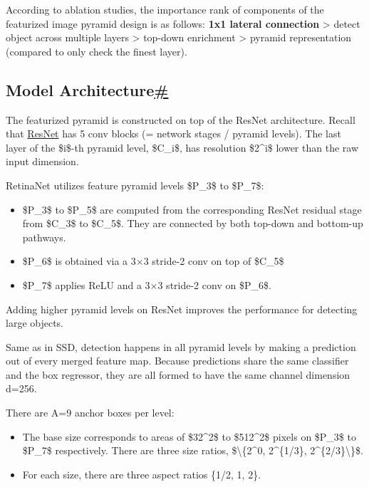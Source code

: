According to ablation studies, the importance rank of components of the featurized image pyramid design is as follows: \textbf{1x1 lateral connection} \textgreater{} detect object across multiple layers \textgreater{} top-down enrichment \textgreater{} pyramid representation (compared to only check the finest layer).

\subsection{\texorpdfstring{Model Architecture\hyperref[model-architecture]{\#}}{Model Architecture\#}}\label{model-architecture}

The featurized pyramid is constructed on top of the ResNet architecture. Recall that \href{TBA}{ResNet} has 5 conv blocks (= network stages / pyramid levels). The last layer of the \$i\$-th pyramid level, \$C\_i\$, has resolution \$2\^{}i\$ lower than the raw input dimension.

RetinaNet utilizes feature pyramid levels \$P\_3\$ to \$P\_7\$:

\begin{itemize}
\tightlist
\item
  \$P\_3\$ to \$P\_5\$ are computed from the corresponding ResNet residual stage from \$C\_3\$ to \$C\_5\$. They are connected by both top-down and bottom-up pathways.
\item
  \$P\_6\$ is obtained via a 3×3 stride-2 conv on top of \$C\_5\$
\item
  \$P\_7\$ applies ReLU and a 3×3 stride-2 conv on \$P\_6\$.
\end{itemize}

Adding higher pyramid levels on ResNet improves the performance for detecting large objects.

Same as in SSD, detection happens in all pyramid levels by making a prediction out of every merged feature map. Because predictions share the same classifier and the box regressor, they are all formed to have the same channel dimension d=256.

There are A=9 anchor boxes per level:

\begin{itemize}
\tightlist
\item
  The base size corresponds to areas of \$32\^{}2\$ to \$512\^{}2\$ pixels on \$P\_3\$ to \$P\_7\$ respectively. There are three size ratios, \$\textbackslash\{2\^{}0, 2\^{}\{1/3\}, 2\^{}\{2/3\}\textbackslash\}\$.
\item
  For each size, there are three aspect ratios \{1/2, 1, 2\}.
\end{itemize}

